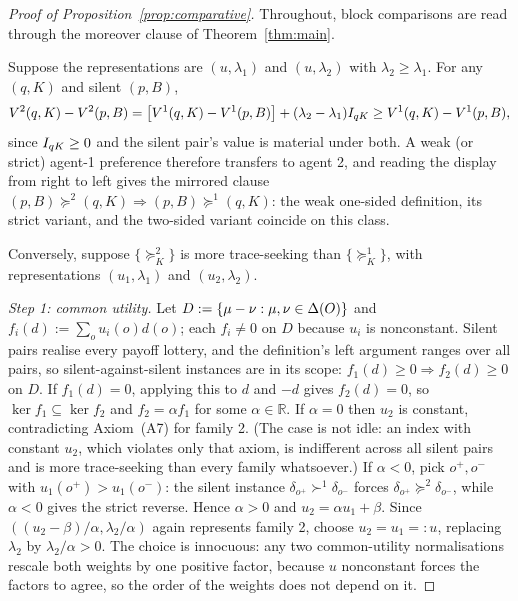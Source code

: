 \begin{proof}[Proof of Proposition~\ref{prop:comparative}]
Throughout, block comparisons are read through the moreover clause of Theorem~\ref{thm:main}.

Suppose the representations are $(u,\lambda_1)$ and $(u,\lambda_2)$ with $\lambda_2\ge\lambda_1$.  For any
$(q,K)$ and silent $(p,B)$,
\[
 V^2(q,K)-V^2(p,B)
 =\bigl[V^1(q,K)-V^1(p,B)\bigr]+(\lambda_2-\lambda_1)I_{qK}
 \ge V^1(q,K)-V^1(p,B),
\]
since $I_{qK}\ge0$ and the silent pair's value is material under both.  A weak (or strict) agent-1 preference
therefore transfers to agent 2, and reading the display from right to left gives the mirrored clause
$(p,B)\succeq^2(q,K)\Rightarrow(p,B)\succeq^1(q,K)$: the weak one-sided definition, its strict variant, and the
two-sided variant coincide on this class.

Conversely, suppose $\{\succeq^2_K\}$ is more trace-seeking than $\{\succeq^1_K\}$, with representations
$(u_1,\lambda_1)$ and $(u_2,\lambda_2)$.

\emph{Step 1: common utility.}  Let $D:=\{\mu-\nu:\mu,\nu\in\Delta(O)\}$ and $f_i(d):=\sum_ou_i(o)d(o)$; each
$f_i\ne0$ on $D$ because $u_i$ is nonconstant.  Silent pairs realise every payoff lottery, and the definition's
left argument ranges over all pairs, so silent-against-silent instances are in its scope:
$f_1(d)\ge0\Rightarrow f_2(d)\ge0$ on $D$.  If $f_1(d)=0$, applying this to $d$ and $-d$ gives $f_2(d)=0$, so
$\ker f_1\subseteq\ker f_2$ and $f_2=\alpha f_1$ for some $\alpha\in\mathbb R$.  If $\alpha=0$ then $u_2$ is
constant, contradicting Axiom~\textup{(A7)} for family 2.  (The case is not idle: an index with constant $u_2$,
which violates only that axiom, is indifferent across all silent pairs and is more trace-seeking than every
family whatsoever.)  If $\alpha<0$, pick $o^+,o^-$ with $u_1(o^+)>u_1(o^-)$: the silent instance
$\delta_{o^+}\succ^1\delta_{o^-}$ forces $\delta_{o^+}\succeq^2\delta_{o^-}$, while $\alpha<0$ gives the strict
reverse.  Hence $\alpha>0$ and $u_2=\alpha u_1+\beta$.  Since $((u_2-\beta)/\alpha,\lambda_2/\alpha)$ again
represents family 2, choose $u_2=u_1=:u$, replacing $\lambda_2$ by $\lambda_2/\alpha>0$.  The choice is
innocuous: any two common-utility normalisations rescale both weights by one positive factor, because
$u$ nonconstant forces the factors to agree, so the order of the weights does not depend on it.


\end{proof}
